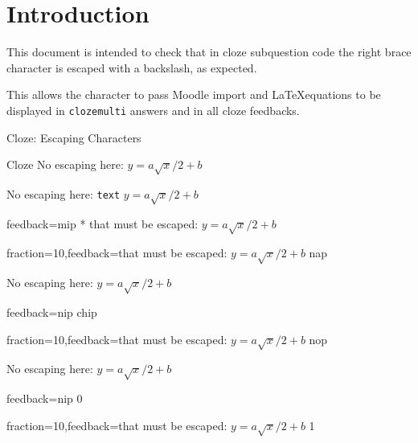 \documentclass{article}
\def\myequation{y=a\sqrt{x}/2+{b}}
\begin{document}
\section*{Introduction}

This document is intended to check that in cloze subquestion code the right 
brace character is escaped with a backslash, as expected.

This allows the character to pass Moodle import and \LaTeX equations to be 
displayed in \texttt{clozemulti} answers and in all cloze feedbacks.

\begin{quiz}{Cloze: Escaping Characters}

\begin{cloze}[points=2]{Cloze}
No escaping here: $\myequation$

\begin{multi}[points=4,vertical,shuffle=false]
No escaping here: \texttt{text} $\myequation$
\item[feedback={mip}]* that must be escaped: $\myequation$
\item[fraction=10,feedback={that must be escaped: $\myequation$}] nap
\end{multi}

\begin{shortanswer}
{No escaping here: } $\myequation$
\item[feedback={nip}] chip
\item[fraction=10,feedback={that must be escaped: $\myequation$}] nop
\end{shortanswer}

\begin{numerical}
{No escaping here: } $\myequation$
\item[feedback={nip}] 0
\item[fraction=10,feedback={that must be escaped: $\myequation$}] 1
\end{numerical}

\end{cloze}

\end{quiz}
\end{document}
